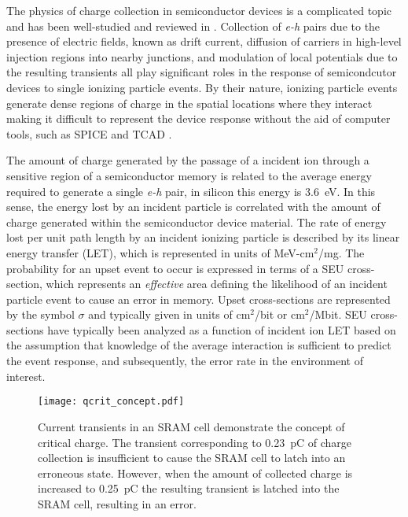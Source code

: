 The physics of charge collection in semiconductor devices is a complicated topic and has been well-studied and reviewed in \cite{mclean1982charge,oldham1983charge,oldham1986revised,dodd1994three,edmonds1997charge,edmonds1998electric,hubert2000study,edmonds2010theoretical,edmonds2011proposed,edmonds2011theoretical,edmonds2011extension,hooten2012significance}.
Collection of \emph{e-h} pairs due to the presence of electric fields, known as drift current, diffusion of carriers in high-level injection regions into nearby junctions, and modulation of local potentials due to the resulting transients all play significant roles in the response of semicondcutor devices to single ionizing particle events.
By their nature, ionizing particle events generate dense regions of charge in the spatial locations where they interact making it difficult to represent the device response without the aid of computer tools, such as SPICE \cite{gadlage2004single,kauppila2009bias} and TCAD \cite{dodd1994three,dasgupta2007effect}.

The amount of charge generated by the passage of a incident ion through a sensitive region of a semiconductor memory is related to the average energy required to generate a single \emph{e-h} pair, in silicon this energy is 3.6~eV.
In this sense, the energy lost by an incident particle is correlated with the amount of charge generated within the semiconductor device material.
The rate of energy lost per unit path length by an incident ionizing particle is described by its linear energy transfer (LET), which is represented in units of MeV-cm$^2$/mg. 
The probability for an upset event to occur is expressed in terms of a SEU cross-section, which represents an \emph{effective} area defining the likelihood of an incident particle event to cause an error in memory.
Upset cross-sections are represented by the symbol $\sigma$ and typically given in units of cm$^2$/bit or cm$^2$/Mbit.
SEU cross-sections have typically been analyzed as a function of incident ion LET based on the assumption that knowledge of the average interaction is sufficient to predict the event response, and subsequently, the error rate in the environment of interest.

\begin{figure}[htbp]
    \begin{center}
        \texttt{[image: qcrit\_concept.pdf]}
    \end{center}
    \caption{Current transients in an SRAM cell demonstrate the concept of critical charge. The transient corresponding to 0.23~pC of charge collection is insufficient to cause the SRAM cell to latch into an erroneous state. However, when the amount of collected charge is increased to 0.25~pC the resulting transient is latched into the SRAM cell, resulting in an error.}
    \label{fig:qcrit_concept}
\end{figure}

